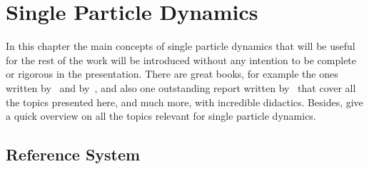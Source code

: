 \chapter{Single Particle Dynamics}\label{cap:single_particle_dynamics}

    In this chapter the main concepts of single particle dynamics that will be useful for the rest of the work will be introduced without any intention to be complete or rigorous in the presentation. There are great books, for example the ones written by~ and by~, and also one outstanding report written by~ that cover all the topics presented here, and much more, with incredible didactics. Besides,  give a quick overview on all the topics relevant for single particle dynamics.

\section{Reference System}

